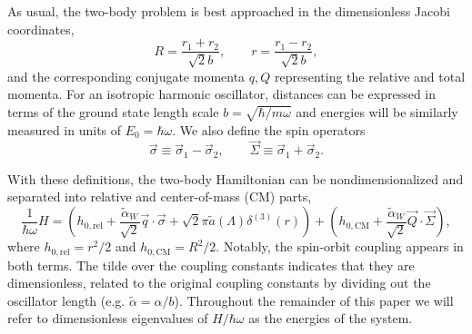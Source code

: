 \documentclass[%
 notitlepage,
 preprint,
showpacs,%
 amsmath,amssymb,
 aps,
pra,
]{revtex4-1}
\begin{document}
As usual, the two-body problem is best approached in the dimensionless Jacobi coordinates,
\begin{equation}
R=\frac{r_1+r_2}{\sqrt{2}b}, \qquad r=\frac{r_1-r_2}{\sqrt{2}b},
\end{equation}
and the corresponding conjugate momenta $q,Q$ representing the relative and total momenta. For an isotropic harmonic oscillator, distances can be expressed in terms of the ground state length scale $b=\sqrt{\hbar/m\omega}$ and energies will be similarly measured in units of $E_0=\hbar\omega$. We also define the spin operators
\begin{equation}
\vec{\sigma}\equiv\vec{\sigma}_1-\vec{\sigma}_2, \qquad \vec{\Sigma}\equiv\vec{\sigma}_1+\vec{\sigma}_2.
\end{equation}

With these definitions, the two-body Hamiltonian can be nondimensionalized and separated into relative and center-of-mass (CM) parts,
\begin{equation}\label{eq:WeylHamiltonian}
\frac{1}{\hbar\omega}H=\left(h_{0,\text{rel}}+\frac{\tilde{\alpha}_W}{\sqrt{2}} \vec{q}\cdot\vec{\sigma} + \sqrt{2}\pi \tilde{a}(\Lambda) \delta^{(3)}(r)\right)+\left(h_{0,\text{CM}}+\frac{\tilde{\alpha}_W}{\sqrt{2}} \vec{Q}\cdot\vec{\Sigma} \right),
\end{equation}
where $h_{0,\text{rel}}=r^2/2$ and $h_{0,\text{CM}}=R^2/2$. Notably, the spin-orbit coupling appears in both terms.  The tilde over the coupling constants indicates that they are dimensionless, related to the original coupling constants by dividing out the oscillator length (e.g. $\tilde{\alpha}=\alpha/b$). Throughout the remainder of this paper we will refer to dimensionless eigenvalues of $H/\hbar\omega$ as the energies of the system.

\end{document}
